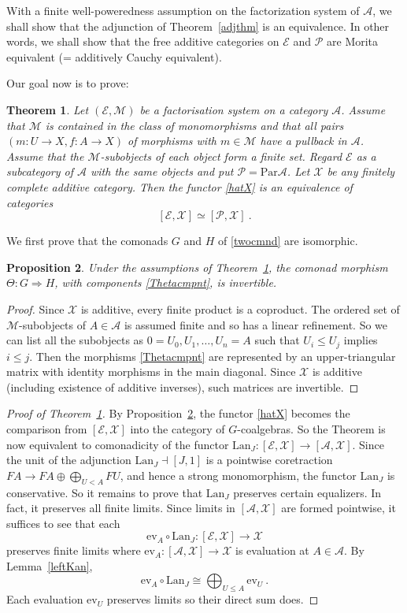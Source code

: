 \documentclass[a4paper,12pt,reqno]{amsart}
\newtheorem{theorem}{Theorem}[section] %
\newtheorem{proposition}[theorem]{Proposition}
\theoremstyle{definition}
\theoremstyle{fact}
\theoremstyle{genquest}
\theoremstyle{step}
\newcommand{\lra}{\longrightarrow}
\newcommand{\Lra}{\Longrightarrow}
\def\CA{{\mathscr A}}
\def\CE{{\mathscr E}}
\def\CM{{\mathscr M}}
\def\CP{{\mathscr P}}
\def\CX{{\mathscr X}}
\begin{document}
With a finite well-poweredness assumption on the factorization system of $\CA$, 
we shall show that the adjunction of Theorem~\ref{adjthm} is an equivalence.
In other words, we shall show that the free additive categories on
$\CE$ and $\CP$ are Morita equivalent (= additively Cauchy equivalent).

Our goal now is to prove:

\begin{theorem}\label{parmainthm}
Let $(\CE,\CM)$ be a factorisation system on a category $\CA$.
Assume that $\CM$ is contained in the class of monomorphisms
and that all pairs $(m :U\rightarrow X,f:A\rightarrow X)$ of morphisms with $m\in \CM$
have a pullback in $\CA$. 
Assume that the $\CM$-subobjects of each object form a finite set.
Regard $\CE$ as a subcategory of $\CA$ with the same objects
and put $\CP = \mathrm{Par}\CA$. 
Let $\CX$ be any finitely complete additive category.
Then the functor \eqref{hatX} is an equivalence of categories
$$[\CE, \CX] \simeq [\CP, \CX] \ . $$
\end{theorem}

We first prove that the comonads $G$ and $H$ of \eqref{twocmnd} are isomorphic.

\begin{proposition}\label{invTheta}
Under the assumptions of Theorem~\ref{parmainthm}, the comonad morphism
$\Theta : G\Lra H$, with components \eqref{Thetacmpnt}, is invertible.
\end{proposition}
\begin{proof}
Since $\CX$ is additive, every finite product is a coproduct.
The ordered set of $\CM$-subobjects of $A \in \CA$ is assumed finite
and so has a linear refinement. 
So we can list all the subobjects as $0=U_0, U_1, \dots , U_n = A$ 
such that $U_i \le U_j$ implies $i \le j$.
Then the morphisms \eqref{Thetacmpnt} are represented by an
upper-triangular matrix with identity morphisms in the main diagonal.
Since $\CX$ is additive (including existence of additive inverses), such
matrices are invertible.
\end{proof}

\begin{proof}[Proof of Theorem~\ref{parmainthm}]
By Proposition~\ref{invTheta}, the functor \eqref{hatX} becomes the
comparison from $[\CE,\CX]$ into the category of $G$-coalgebras. 
So the Theorem is now equivalent to comonadicity of the functor 
$\mathrm{Lan}_J : [\CE,\CX]\lra [\CA,\CX]$.
Since the unit of the adjunction $\mathrm{Lan}_J \dashv [J,1]$ is a
pointwise coretraction $FA \lra FA\oplus \bigoplus_{U< A}{FU}$, 
and hence a strong monomorphism, 
the functor $\mathrm{Lan}_J$ is conservative. 
So it remains to prove that $\mathrm{Lan}_J$ preserves certain equalizers.
In fact, it preserves all finite limits. Since limits in $[\CA,\CX]$ are formed
pointwise, it suffices to see that each 
$$\mathrm{ev}_A\circ \mathrm{Lan}_J : [\CE,\CX]\lra \CX$$
preserves finite limits where $\mathrm{ev}_A : [\CA,\CX]\lra \CX$ is evaluation
at $A\in \CA$. By Lemma~\ref{leftKan}, 
$$\mathrm{ev}_A\circ \mathrm{Lan}_J \cong \bigoplus_{U\le A}\mathrm{ev}_U \ .$$
Each evaluation $\mathrm{ev}_U$ preserves limits so their direct sum does.    
\end{proof}
  
\end{document}

